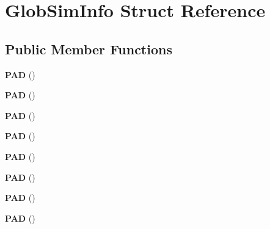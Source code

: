 \hypertarget{structGlobSimInfo}{\section{Glob\-Sim\-Info Struct Reference}
\label{structGlobSimInfo}
}
\subsection*{Public Member Functions}
\begin{DoxyCompactItemize}
\item 
\hypertarget{structGlobSimInfo_af935afdb099067b849b990db2df55447}{{\bfseries P\-A\-D} ()}\label{structGlobSimInfo_af935afdb099067b849b990db2df55447}

\item 
\hypertarget{structGlobSimInfo_af935afdb099067b849b990db2df55447}{{\bfseries P\-A\-D} ()}\label{structGlobSimInfo_af935afdb099067b849b990db2df55447}

\item 
\hypertarget{structGlobSimInfo_af935afdb099067b849b990db2df55447}{{\bfseries P\-A\-D} ()}\label{structGlobSimInfo_af935afdb099067b849b990db2df55447}

\item 
\hypertarget{structGlobSimInfo_af935afdb099067b849b990db2df55447}{{\bfseries P\-A\-D} ()}\label{structGlobSimInfo_af935afdb099067b849b990db2df55447}

\item 
\hypertarget{structGlobSimInfo_af935afdb099067b849b990db2df55447}{{\bfseries P\-A\-D} ()}\label{structGlobSimInfo_af935afdb099067b849b990db2df55447}

\item 
\hypertarget{structGlobSimInfo_af935afdb099067b849b990db2df55447}{{\bfseries P\-A\-D} ()}\label{structGlobSimInfo_af935afdb099067b849b990db2df55447}

\item 
\hypertarget{structGlobSimInfo_af935afdb099067b849b990db2df55447}{{\bfseries P\-A\-D} ()}\label{structGlobSimInfo_af935afdb099067b849b990db2df55447}

\item 
\hypertarget{structGlobSimInfo_af935afdb099067b849b990db2df55447}{{\bfseries P\-A\-D} ()}\label{structGlobSimInfo_af935afdb099067b849b990db2df55447}

\end{DoxyCompactItemize}
